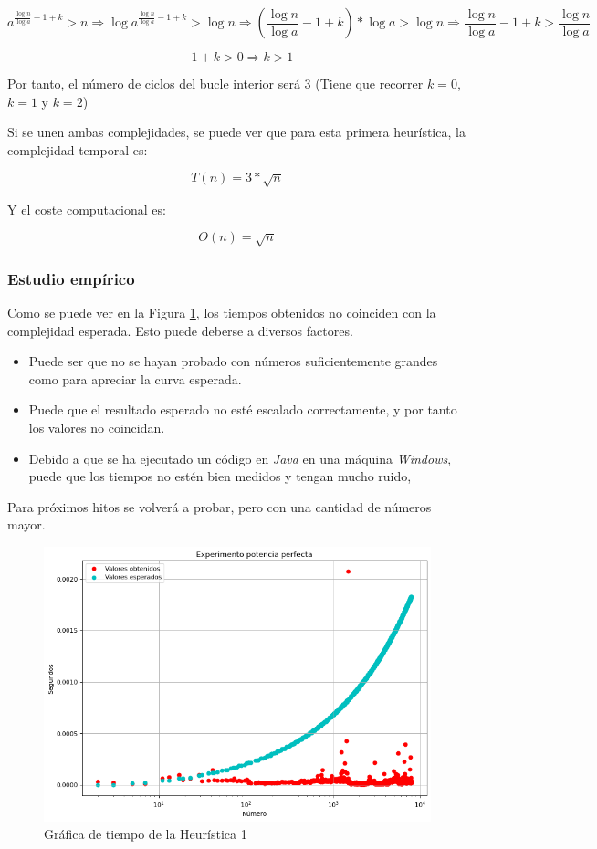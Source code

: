 \documentclass{uc3mpracticas}
\begin{document}
  \vspace{2mm}

  $$ a^{\frac{\log n}{\log a} - 1 + k} > n \Rightarrow \log a^{\frac{\log n}{\log a} - 1 + k} > \log n \Rightarrow (\frac{\log n}{\log a} - 1 + k) * \log a > \log n \Rightarrow  \frac{\log n}{\log a} - 1 + k > \frac{\log n}{\log a}$$

  $$ -1 + k > 0 \Rightarrow k > 1 $$

  Por tanto, el número de ciclos del bucle interior será 3 (Tiene que recorrer $k=0$, $k=1$ y $k=2$)

  \vspace{2mm}

  Si se unen ambas complejidades, se puede ver que para esta primera heurística, la complejidad temporal es:

  $$ T(n) = \displaystyle 3*\sqrt{n}$$

  Y el coste computacional es:

  $$ O(n) = \sqrt{n}$$


  \subsubsection{Estudio empírico}\label{empirico}

  Como se puede ver en la Figura \ref{fig:h1}, los tiempos obtenidos no coinciden con la complejidad esperada. Esto puede deberse a diversos factores.

  \begin{itemize}
    \item Puede ser que no se hayan probado con números suficientemente grandes como para apreciar la curva esperada.
    \item Puede que el resultado esperado no esté escalado correctamente, y por tanto los valores no coincidan.
    \item Debido a que se ha ejecutado un código en \textit{Java} en una máquina \textit{Windows}, puede que los tiempos no estén bien medidos y tengan mucho ruido,
  \end{itemize}

  Para próximos hitos se volverá a probar, pero con una cantidad de números mayor.

  \begin{figure}[!h]
    \centering
    \includegraphics[width=.8\linewidth]{./Images/h1.png}
    \caption{Gráfica de tiempo de la Heurística 1}
    \label{fig:h1}
  \end{figure}
\end{document}
